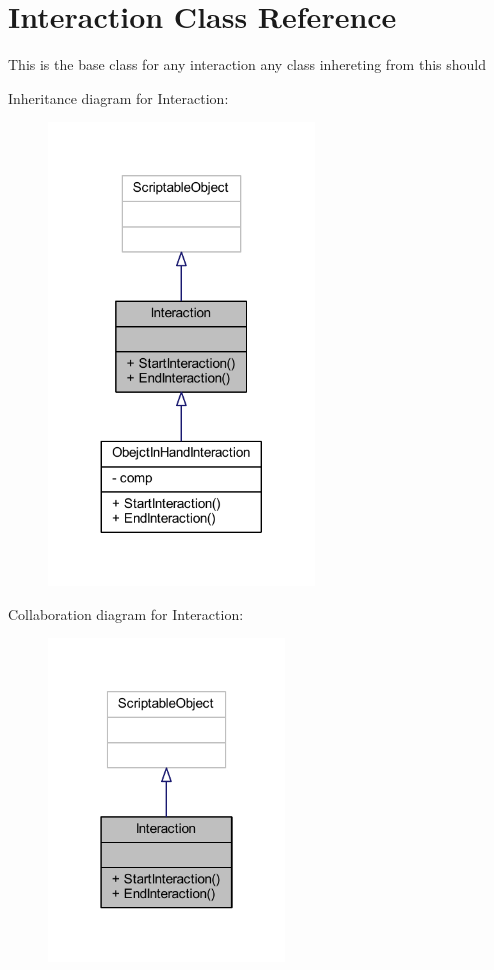 \hypertarget{class_interaction}{}\section{Interaction Class Reference}
\label{class_interaction}


This is the base class for any interaction any class inhereting from this should  




Inheritance diagram for Interaction\+:
\nopagebreak
\begin{figure}[H]
\begin{center}
\leavevmode
\includegraphics[width=200pt]{class_interaction__inherit__graph}
\end{center}
\end{figure}


Collaboration diagram for Interaction\+:
\nopagebreak
\begin{figure}[H]
\begin{center}
\leavevmode
\includegraphics[width=178pt]{class_interaction__coll__graph}
\end{center}
\end{figure}
